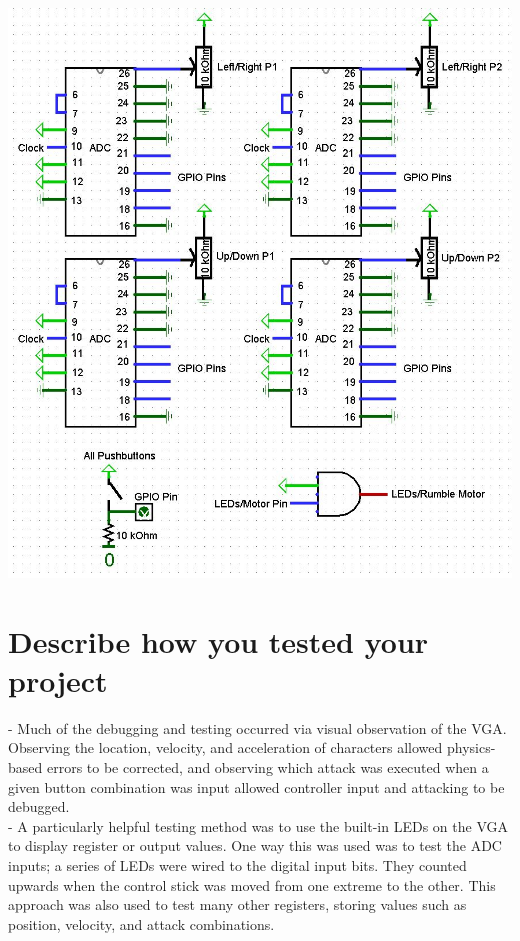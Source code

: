 \documentclass[12pt]{article} %
\begin{document}
\includegraphics[scale=0.75]{circuit}\\


\section{Describe how you tested your project}
- Much of the debugging and testing occurred via visual observation of the VGA. Observing the location, velocity, and acceleration of characters allowed physics-based errors to be corrected, and observing which attack was executed when a given button combination was input allowed controller input and attacking to be debugged.\\

-  A particularly helpful testing method was to use the built-in LEDs on the VGA to display register or output values. One way this was used was to test the ADC inputs; a series of LEDs were wired to the digital input bits. They counted upwards when the control stick was moved from one extreme to the other. This approach was also used to test many other registers, storing values such as position, velocity, and attack combinations.\\
\end{document}
